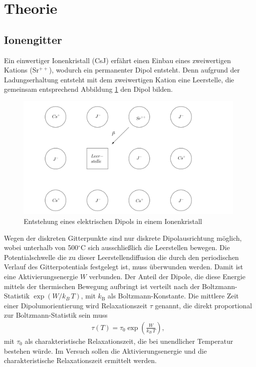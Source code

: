 

\section{Theorie}
\setcounter{page}{1}
\subsection{Ionengitter}
Ein einwertiger Ionenkristall (CsJ) erfährt einen Einbau eines zweiwertigen Kations (Sr$^{++}$), wodurch ein permanenter Dipol entsteht. Denn aufgrund
der Ladungserhaltung entsteht mit dem zweiwertigen Kation eine Leerstelle, die gemeinsam entsprechend Abbildung \ref{pic_dipGitt} den Dipol bilden.
\begin{figure}[H]
\includegraphics[width=\textwidth]{../pics/dipGitt.png}
\caption{Entstehung eines elektrischen Dipols in einem Ionenkristall}
\label{pic_dipGitt}
\end{figure}
Wegen der diskreten Gitterpunkte sind nur diskrete Dipolausrichtung möglich, wobei unterhalb von 500$^\circ$C sich ausschließlich die Leerstellen bewegen.
Die Potentialschwelle die zu dieser Leerstellendiffusion die durch den periodischen Verlauf des Gitterpotentials festgelegt ist, muss überwunden werden.
Damit ist eine Aktivierungsenergie $W$ verbunden. Der Anteil der Dipole, die diese Energie mittels der thermischen Bewegung aufbringt ist
verteilt nach der Boltzmann-Statistik $\exp(W/k_B\,T)$, mit $k_\text{B}$ als Boltzmann-Konstante. Die mittlere Zeit einer Dipolumorientierung wird Relaxationszeit
$\tau$ genannt, die direkt proportional zur Boltzmann-Statistik sein muss
\begin{align}
 \tau(T) = \tau_0 \exp\left(\frac{W}{k_B\, T}\right),
 \label{eq_tau(W)}
\end{align}
mit $\tau_0$ als charakteristische Relaxationszeit, die bei unendlicher Temperatur bestehen würde. Im Versuch sollen die Aktivierungsenergie und die
charakteristische Relaxationszeit ermittelt werden.

